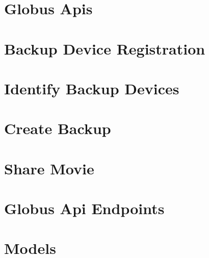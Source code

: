 \chapter{Globus Apis\label{appendix:globusapis}}

\chapter{Backup Device Registration\label{appendix:backupdeviceregistration}}

\chapter{Identify Backup Devices\label{appendix:identifybackupdevices}}

\chapter{Create Backup\label{appendix:createbackup}}

\chapter{Share Movie\label{appendix:sharemovie}}

\chapter{Globus Api Endpoints\label{appendix:globusapiendpoints}}

\chapter{Models\label{appendix:models}}


